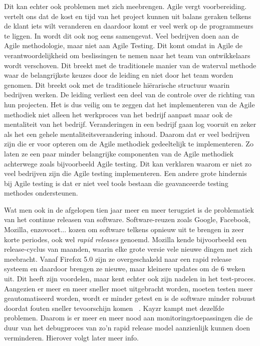 Dit kan echter ook problemen met zich meebrengen. Agile vergt voorbereiding. \textcite{CHAKRAVORTY2014536} vertelt ons dat de kost en tijd van het project kunnen uit balans geraken telkens de klant iets wilt veranderen en daardoor komt er veel werk op de programmeurs te liggen. In \autocite{Borland2012} wordt dit ook nog eens samengevat. Veel bedrijven doen aan de Agile methodologie, maar niet aan Agile Testing. Dit komt omdat in Agile de verantwoordelijkheid om beslissingen te nemen naar het team van ontwikkelaars wordt verschoven. Dit breekt met de traditionele manier van de waterval methode waar de belangrijkste keuzes door de leiding en niet door het team worden genomen. Dit breekt ook met de traditionele hiërarische structuur waarin bedrijven werken. De leiding verliest een deel van de controle over de richting van hun projecten. Het is dus veilig om te zeggen dat het implementeren van de Agile methodiek niet alleen het werkproces van het bedrijf aanpast maar ook de mentaliteit van het bedrijf. Veranderingen in een bedrijf gaan log vooruit en zeker als het een gehele mentaliteitsverandering inhoud. Daarom dat er veel bedrijven zijn die er voor opteren om de Agile methodiek gedeeltelijk te implementeren. Zo laten ze een paar minder belangrijke componenten van de Agile methodiek achterwege zoals bijvoorbeeld Agile testing. Dit kan verklaren waarom er niet zo veel bedrijven zijn die Agile testing implementeren. Een andere grote hindernis bij Agile testing is dat er niet veel tools bestaan die geavanceerde testing methodes ondersteunen.

Wat men ook in de afgelopen tien jaar meer en meer terugziet is de problematiek van het continue releasen van software. Software-reuzen zoals Google, Facebook, Mozilla, enzovoort... kozen om software telkens opnieuw uit te brengen in zeer korte periodes, ook wel \textit{rapid releases} genoemd. Mozilla kende bijvoorbeeld een release-cyclus van maanden, waarin elke grote versie vele nieuwe dingen met zich meebracht. Vanaf Firefox 5.0 zijn ze overgeschakeld naar een rapid release systeem en daardoor brengen ze nieuwe, maar kleinere updates om de 6 weken uit. Dit heeft zijn voordelen, maar kent echter ook zijn nadelen in het test-proces. Aangezien er meer en meer sneller moet uitgebracht worden, moeten testen meer geautomatiseerd worden, wordt er minder getest en is de software minder robuust doordat fouten sneller tevoorschijn komen ~\autocite{Maentylae2013}. Kayzr kampt met dezelfde problemen. Daarom is er meer en meer nood aan monitoringstoepassingen die de duur van het debugproces van zo'n rapid release model aanzienlijk kunnen doen verminderen. Hierover volgt later meer info. 

